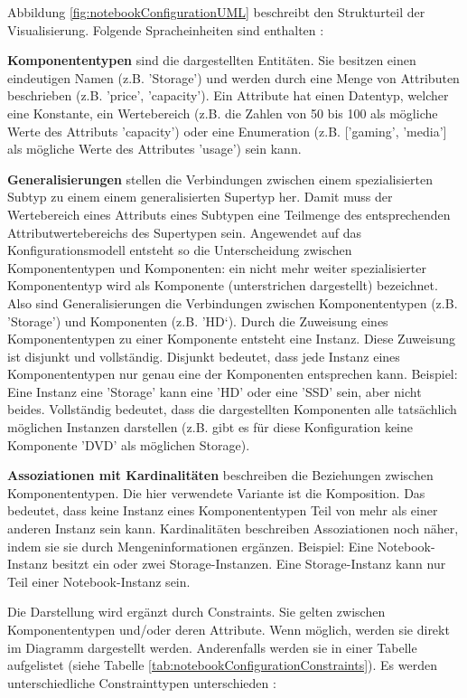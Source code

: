 \documentclass[12pt,a4paper,bibliography=totocnumbered,listof=totoc]{scrartcl}
\begin{document}
Abbildung \ref{fig:notebookConfigurationUML} beschreibt den Strukturteil der Visualisierung. Folgende Spracheinheiten sind enthalten \citep{felferning14}:
\begin{compactitem}
\item \textbf{Komponententypen} sind die dargestellten Entitäten. Sie besitzen einen eindeutigen Namen (z.B. 'Storage') und werden durch eine Menge von Attributen beschrieben (z.B. 'price', 'capacity'). Ein Attribute hat einen Datentyp, welcher eine Konstante, ein Wertebereich (z.B. die Zahlen von 50 bis 100 als mögliche Werte des Attributs 'capacity') oder eine Enumeration (z.B. ['gaming', 'media'] als mögliche Werte des Attributes 'usage') sein kann.
\item \textbf{Generalisierungen} stellen die Verbindungen zwischen einem spezialisierten Subtyp zu einem einem generalisierten Supertyp her. Damit muss der Wertebereich eines Attributs eines Subtypen eine Teilmenge des entsprechenden Attributwertebereichs des Supertypen sein. Angewendet auf das Konfigurationsmodell entsteht so die Unterscheidung zwischen Komponententypen und Komponenten: ein nicht mehr weiter spezialisierter Komponententyp wird als Komponente (unterstrichen dargestellt) bezeichnet. Also sind Generalisierungen die Verbindungen zwischen Komponententypen (z.B. 'Storage') und Komponenten (z.B. 'HD‘). Durch die Zuweisung eines Komponententypen zu einer Komponente entsteht eine Instanz. Diese Zuweisung ist disjunkt und vollständig. Disjunkt bedeutet, dass jede Instanz eines Komponententypen nur genau eine der Komponenten entsprechen kann. Beispiel: Eine Instanz eine 'Storage' kann eine 'HD' oder eine 'SSD' sein, aber nicht beides. Vollständig bedeutet, dass die dargestellten Komponenten alle tatsächlich möglichen Instanzen darstellen (z.B. gibt es für diese Konfiguration keine Komponente 'DVD' als möglichen Storage).
\item \textbf{Assoziationen mit Kardinalitäten} beschreiben die Beziehungen zwischen Komponententypen. Die hier verwendete Variante ist die Komposition. Das bedeutet, dass keine Instanz eines Komponententypen Teil von mehr als einer anderen Instanz sein kann. Kardinalitäten beschreiben Assoziationen noch näher, indem sie sie durch Mengeninformationen ergänzen. Beispiel: Eine Notebook-Instanz besitzt ein oder zwei Storage-Instanzen. Eine Storage-Instanz kann nur Teil einer Notebook-Instanz sein.
\end{compactitem}

Die Darstellung wird ergänzt durch Constraints. Sie gelten zwischen Komponententypen und/oder deren Attribute. Wenn möglich, werden sie direkt im Diagramm dargestellt werden. Anderenfalls werden sie in einer Tabelle aufgelistet (siehe Tabelle \ref{tab:notebookConfigurationConstraints}). Es werden unterschiedliche Constrainttypen unterschieden \citep{felferning14}:
\end{document}
